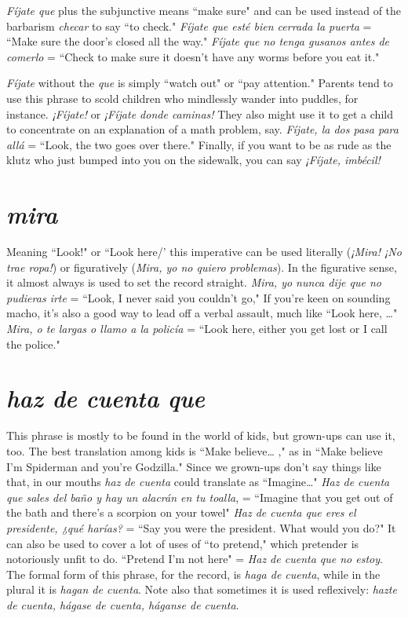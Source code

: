 \emph{Fíjate que} plus the subjunctive means ``make sure" and can be
used instead of the barbarism \emph{checar} to say ``to check." \emph{Fíjate que esté
	bien cerrada la puerta} = ``Make sure the door's closed all the way."
\emph{Fíjate que no tenga gusanos antes de comerlo} = ``Check to make sure
it doesn't have any worms before you eat it."

\emph{Fíjate} without the \emph{que} is simply ``watch out" or ``pay attention." Parents tend to use this phrase to scold children who mindlessly
wander into puddles, for instance. \emph{¡Fíjate!} or \emph{¡Fíjate donde caminas!}
They also might use it to get a child to concentrate on an explanation
of a math problem, say. \emph{Fíjate, la dos pasa para allá} = ``Look, the two
goes over there." Finally, if you want to be as rude as the klutz who
just bumped into you on the sidewalk, you can say \emph{¡Fíjate, imbécil!}

\section{\emph{mira}}

Meaning ``Look!" or ``Look here/' this imperative can be used
literally (\emph{¡Mira! ¡No trae ropa!}) or figuratively (\emph{Mira, yo no quiero
	problemas}). In the figurative sense, it almost always is used to set the
record straight. \emph{Mira, yo nunca dije que no pudieras irte} = ``Look,
I never said you couldn't go," If you're keen on sounding macho, it's
also a good way to lead off a verbal assault, much like ``Look here, \ldots{}"
\emph{Mira, o te largas o llamo a la policía} = ``Look here, either you get
lost or I call the police."

\section{\emph{haz de cuenta que}}

This phrase is mostly to be found in the world of kids, but
grown-ups can use it, too. The best translation among kids is ``Make
believe\ldots{} ," as in ``Make believe I'm Spiderman and you're Godzilla."
Since we grown-ups don't say things like that, in our mouths \emph{haz de
	cuenta} could translate as ``Imagine\ldots{}" \emph{Haz de cuenta que sales del
	baño y hay un alacrán en tu toalla}, = ``Imagine that you get out of the
bath and there's a scorpion on your towel" \emph{Haz de cuenta que eres el
	presidente, ¿qué harías?} = ``Say you were the president. What would
you do?" It can also be used to cover a lot of uses of ``to pretend,"
which pretender is notoriously unfit to do. ``Pretend I'm not here" =
\emph{Haz de cuenta que no estoy}. The formal form of this phrase, for the
record, is \emph{haga de cuenta}, while in the plural it is \emph{hagan de cuenta}.
Note also that sometimes it is used reflexively: \emph{hazte de cuenta, hágase de cuenta, háganse de cuenta}.

